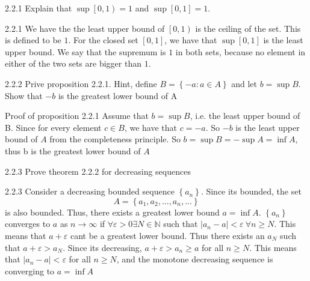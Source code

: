 \documentclass[a4paper,norsk]{article}
\renewcommand{\geq}{\geqslant}
\renewcommand{\epsilon}{\varepsilon}
\begin{document}
\begin{oppgavebox}{2.2.1}{}
Explain that $ \sup \left[ 0, 1 \right) = 1 $ and $ \sup \left[ 0, 1 \right] = 1 $. 
\begin{proofbox}{2.2.1}{}
  We have the the least upper bound of $ \left[ 0, 1 \right)  $ is the ceiling of the set. This is defined to be $ 1 $. For the closed set $ \left[ 0, 1 \right]  $, we have that $ \sup \left[ 0, 1 \right] $ is the least upper bound. We say that the supremum is $ 1 $ in both sets, because no element in either of the two sets are bigger than $ 1 $.
\end{proofbox}
\end{oppgavebox}

\begin{oppgavebox}{2.2.2}{}
Prive proposition 2.2.1. Hint, define $ B = \left\{ -a : a \in A \right\}  $ and let $ b = \sup B $. Show that $ -b $ is the greatest lower bound of A
\begin{proofbox}{Proof of proposition 2.2.1}{}
  Assume that $ b = \sup B $, i.e. the least upper bound of B. Since for every element $ c \in B $, we have that $ c = -a $. So $ -b $ is the least upper bound of $ A $ from the completeness principle. So $ b = \sup B = - \sup A = \inf A $, thus b is the greatest lower bound of $ A $ 
\end{proofbox}
\end{oppgavebox}

\begin{oppgavebox}{2.2.3}{}
Prove theorem 2.2.2 for decreasing sequences

\begin{proofbox}{2.2.3}{}
  Consider a decreasing bounded sequence $ \left\{ a_n \right\}  $. Since its bounded, the set 
  \[
      A = \left\{ a_1, a_2, ..., a_n, ... \right\} 
  \]
  is also bounded. Thus, there exists a greatest lower bound $ a = \inf A $. $ \left\{ a_n \right\}  $ converges to $ a $ as $ n \to \infty $ if $ \forall \epsilon > 0 \exists  N \in  \mathbb{N} $ such that $ \left| a_n - a \right| < \epsilon  \: \forall  n \geq N $. This means that $ a + \epsilon  $ cant be a greatest lower bound. Thus there exists an $ a_N $ such that $ a+ \epsilon > a_N$. Since its decreasing, $ a + \epsilon > a_n \geq a $ for all $ n \geq N $. This means that $ \left| a_n - a \right| < \epsilon  $ for all $ n\geq N $, and the monotone decreasing sequence is converging to $ a = \inf A $ 
  
\end{proofbox}
\end{oppgavebox}
\end{document}
